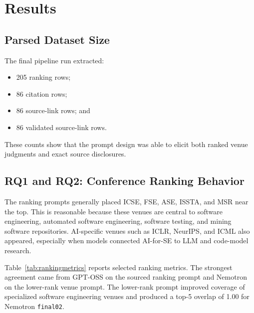 \documentclass[acmsmall,review,nonacm]{acmart}
\begin{document}
\section{Results}

\subsection{Parsed Dataset Size}

The final pipeline run extracted:

\begin{itemize}
  \item 205 ranking rows;
  \item 86 citation rows;
  \item 86 source-link rows; and
  \item 86 validated source-link rows.
\end{itemize}

These counts show that the prompt design was able to elicit both ranked venue
judgments and exact source disclosures.

\subsection{RQ1 and RQ2: Conference Ranking Behavior}

The ranking prompts generally placed ICSE, FSE, ASE, ISSTA, and MSR near the
top. This is reasonable because these venues are central to software
engineering, automated software engineering, software testing, and mining
software repositories. AI-specific venues such as ICLR, NeurIPS, and ICML also
appeared, especially when models connected AI-for-SE to LLM and code-model
research.

Table~\ref{tab:rankingmetrics} reports selected ranking metrics. The strongest
agreement came from GPT-OSS on the sourced ranking prompt and Nemotron on the
lower-rank venue prompt. The lower-rank prompt improved coverage of specialized
software engineering venues and produced a top-5 overlap of 1.00 for Nemotron
\texttt{final02}.
\end{document}
